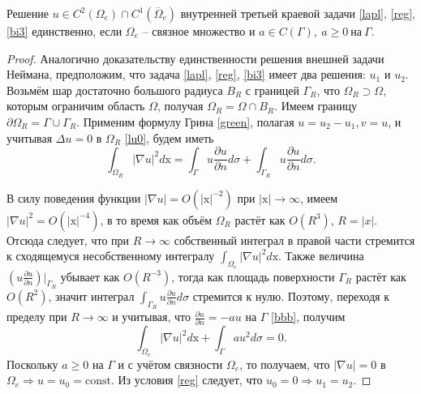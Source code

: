     \begin{theorem}
        Решение \( u \in C^2 (\Omega_e) \cap C^1(\overline{\Omega}_e) \) внутренней третьей краевой задачи \eqref{lapl}, \eqref{reg}, \eqref{bi3} единственно, если \( \Omega_e \) -- связное множество и \( a \in C(\Gamma), ~ a \geq 0 ~ \text{на} ~ \Gamma. \label{i2} \)
    \end{theorem}

    \begin{proof}
        Аналогично доказательству единственности решения внешней задачи Неймана, предположим, что задача \eqref{lapl}, \eqref{reg}, \eqref{bi3} имеет два решения: \(u_1\) и \(u_2\). Возьмём шар достаточно большого радиуса \(B_R\) с границей \(\Gamma_R\), что \(\Omega_R \supset \Omega\), которым ограничим область \(\Omega\), получая \(\Omega_R = \Omega \cap B_R\). Имеем границу \( \partial \Omega_R = \Gamma \cup \Gamma_R \). Применим формулу Грина \eqref{green}, полагая \( u = u_2 - u_1, v = u \), и учитывая \(\Delta u = 0\) в \(\Omega_R\) \eqref{lu0}, будем иметь
        \begin{equation}
            \int_{\Omega_R} | \nabla u |^2 d\mathrm{x} = \int_\Gamma u \frac{\partial u}{\partial n} d\sigma + \int_{\Gamma_R} u \frac{\partial u}{\partial n} d\sigma.
        \end{equation} 
        
        В силу поведения функции \( |\nabla u| = O(|\mathrm{x}|^{-2}) \) при \(|\mathrm{x}| \to \infty \), имеем \( |\nabla u|^2 = O( |\mathrm{x}|^{-4}) \), в то время как объём \(\Omega_R\) растёт как \(O (R^3) \), \(R = |x|\). Отсюда следует, что при \(R \to \infty \) собственный интеграл в правой части стремится к сходящемуся несобственному интегралу \( \int_{\Omega_e} | \nabla u |^2 d\mathrm{x} \). Также величина \( \left( u \frac{\partial u}{\partial n} \right) \big|_{\Gamma_R} \) убывает как \( O( R^{-3}) \), тогда как площадь поверхности \( \Gamma_R \) растёт как \( O(R^2) \), значит интеграл $\int_{\Gamma_R} u \frac{\partial u}{\partial n} d\sigma$ стремится к нулю. Поэтому, переходя к пределу при \(R \to \infty \) и учитывая, что \( \frac{\partial u}{\partial n} = -au \) на \( \Gamma \) \eqref{bbb}, получим
        \begin{equation}
            \int_{\Omega_e} | \nabla u |^2 d\mathrm{x} + \int_\Gamma au^2 d\sigma = 0.
        \end{equation}
        Поскольку \( a \geq 0 \) на \( \Gamma \) и с учётом связности $\Omega_e$, то получаем, что \( |\nabla u| = 0 \) в \(\Omega_e  \Rightarrow u = u_0 = \mathrm{const} \). Из условия \eqref{reg} следует, что \( u_0 = 0 \Rightarrow u_1 = u_2 \).        
    \end{proof}
